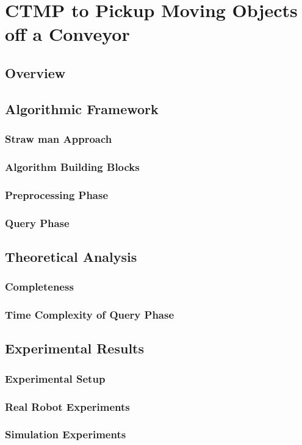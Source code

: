 \documentclass[a4paper,10pt]{article}
\begin{document}
\section{CTMP to Pickup Moving Objects off a Conveyor}
\label{sec:conveyor}
\subsection{Overview}
\subsection{Algorithmic Framework}
\subsubsection{Straw man Approach}
\subsubsection{Algorithm Building Blocks}
\subsubsection{Preprocessing Phase}
\subsubsection{Query Phase}
\subsection{Theoretical Analysis}
\subsubsection{Completeness}
\subsubsection{Time Complexity of Query Phase}
\subsection{Experimental Results}
\subsubsection{Experimental Setup}
\subsubsection{Real Robot Experiments}
\subsubsection{Simulation Experiments}
\end{document}
